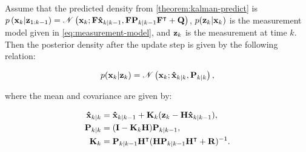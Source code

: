 \begin{theorem}\label{theorem:kalman-update}
    Assume that the predicted density from \ref{theorem:kalman-predict} is $p\left(\vecat{x}{k} | \vecat{z}{1:k-1}\right)=\allowbreak \mathscr{N}\left(\vecat{x}{k}; \mathbf{F} \vecat{\hat{x}}{k|k-1}, \mathbf{F} \vecat{P}{k|k-1} \mathbf{F}^\intercal + \mathbf{Q}\right)$, $p(\vecat{z}{k} | \vecat{x}{k})$ is the measurement model given in \ref{eq:measurement-model},
    and $\vecat{z}{k}$ is the measurement at time $k$. Then the posterior density after the update step is given by the following relation:

    \begin{equation}
        p(\vecat{x}{k} | \vecat{z}{k}) = 
        \mathscr{N}\left(
            \vecat{x}{k}; \vecat{\hat{x}}{k|k}, \vecat{P}{k|k}
        \right),
    \end{equation}

    where the mean and covariance are given by:

    \begin{align}
        \vecat{\hat{x}}{k|k}
        &= \vecat{\hat{x}}{k|k-1} + \vecat{K}{k}(\vecat{z}{k} - \mathbf{H}\vecat{\hat{x}}{k|k-1}), \\
        \vecat{P}{k|k}
        &= (\mathbf{I} - \vecat{K}{k}\mathbf{H})\vecat{P}{k|k-1}, \\
        \vecat{K}{k} 
        &= \vecat{P}{k|k-1}\mathbf{H}^\intercal(\mathbf{H}\vecat{P}{k|k-1}\mathbf{H}^\intercal + \mathbf{R})^{-1}.
    \end{align}
\end{theorem}

